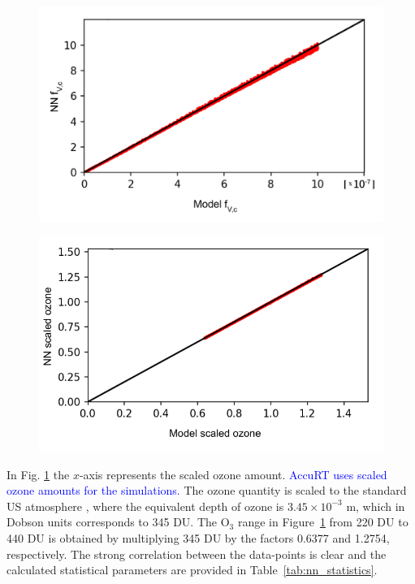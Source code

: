 \documentclass{optica-article}
\begin{document}
\begin{figure}[H]
	\centering
	\begin{minipage}{0.6\textwidth}
		\centering
		\includegraphics[width=1\linewidth]{NN_COD_val.jpg}
		\label{fig:nncodvalid}
	\end{minipage}
	\begin{minipage}{0.6\textwidth}
		\centering
		\includegraphics[width=1\linewidth]{NN_ozone_val.pdf}
		\label{fig:nnozonevalid}
	\end{minipage}
\end{figure}

In Fig. \ref{fig:nnozonevalid} the $x$-axis represents the scaled ozone amount.
\textcolor{blue}{AccuRT uses scaled ozone amounts for the simulations.}
The ozone quantity is scaled to the standard US atmosphere \cite{USstandardatmosphere}, where the equivalent depth of ozone is $3.45 \times 10^{-3}$ m, which in Dobson units corresponds to 345 DU. 
The O$_3$ range in Figure~\ref{fig:nnozonevalid} from 220 DU to  440 DU is obtained by multiplying 345 DU by the factors 0.6377 and 1.2754, respectively. 
The strong correlation between the data-points is clear and the calculated statistical parameters are provided in Table~\ref{tab:nn_statistics}.
\end{document}
